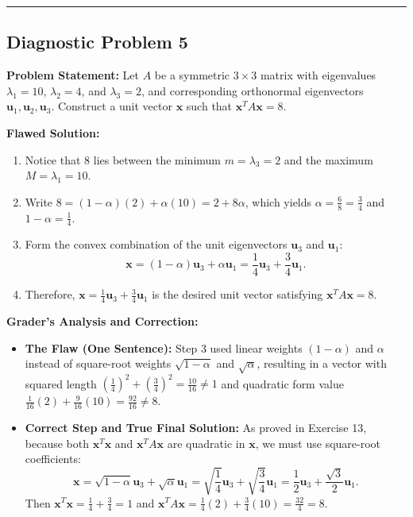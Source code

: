 \documentclass[11pt, letterpaper]{article}
\theoremstyle{definition}
\theoremstyle{remark}
\begin{document}
\medskip
\hrule
\medskip

\subsection*{Diagnostic Problem 5}
\textbf{Problem Statement:} Let $A$ be a symmetric $3 \times 3$ matrix with eigenvalues $\lambda_1 = 10$, $\lambda_2 = 4$, and $\lambda_3 = 2$, and corresponding orthonormal eigenvectors $\mathbf{u}_1, \mathbf{u}_2, \mathbf{u}_3$. Construct a unit vector $\mathbf{x}$ such that $\mathbf{x}^T A \mathbf{x} = 8$.

\textbf{Flawed Solution:}
\begin{enumerate}[label=\arabic*.]
    \item Notice that $8$ lies between the minimum $m = \lambda_3 = 2$ and the maximum $M = \lambda_1 = 10$.
    \item Write $8 = (1-\alpha)(2) + \alpha(10) = 2 + 8\alpha$, which yields $\alpha = \frac{6}{8} = \frac{3}{4}$ and $1 - \alpha = \frac{1}{4}$.
    \item Form the convex combination of the unit eigenvectors $\mathbf{u}_3$ and $\mathbf{u}_1$:
    \[
    \mathbf{x} = (1-\alpha)\mathbf{u}_3 + \alpha\mathbf{u}_1 = \frac{1}{4}\mathbf{u}_3 + \frac{3}{4}\mathbf{u}_1.
    \]
    \item Therefore, $\mathbf{x} = \frac{1}{4}\mathbf{u}_3 + \frac{3}{4}\mathbf{u}_1$ is the desired unit vector satisfying $\mathbf{x}^T A \mathbf{x} = 8$.
\end{enumerate}

\textbf{Grader's Analysis and Correction:}
\begin{itemize}
    \item \textbf{The Flaw (One Sentence):} Step 3 used linear weights $(1-\alpha)$ and $\alpha$ instead of square-root weights $\sqrt{1-\alpha}$ and $\sqrt{\alpha}$, resulting in a vector with squared length $\left(\frac{1}{4}\right)^2 + \left(\frac{3}{4}\right)^2 = \frac{10}{16} \ne 1$ and quadratic form value $\frac{1}{16}(2) + \frac{9}{16}(10) = \frac{92}{16} \ne 8$.
    \item \textbf{Correct Step and True Final Solution:} As proved in Exercise 13, because both $\mathbf{x}^T\mathbf{x}$ and $\mathbf{x}^T A \mathbf{x}$ are quadratic in $\mathbf{x}$, we must use square-root coefficients:
    \[
    \mathbf{x} = \sqrt{1-\alpha}\mathbf{u}_3 + \sqrt{\alpha}\mathbf{u}_1 = \sqrt{\frac{1}{4}}\mathbf{u}_3 + \sqrt{\frac{3}{4}}\mathbf{u}_1 = \frac{1}{2}\mathbf{u}_3 + \frac{\sqrt{3}}{2}\mathbf{u}_1.
    \]
    Then $\mathbf{x}^T\mathbf{x} = \frac{1}{4} + \frac{3}{4} = 1$ and $\mathbf{x}^T A \mathbf{x} = \frac{1}{4}(2) + \frac{3}{4}(10) = \frac{32}{4} = 8$.
\end{itemize}
\end{document}
